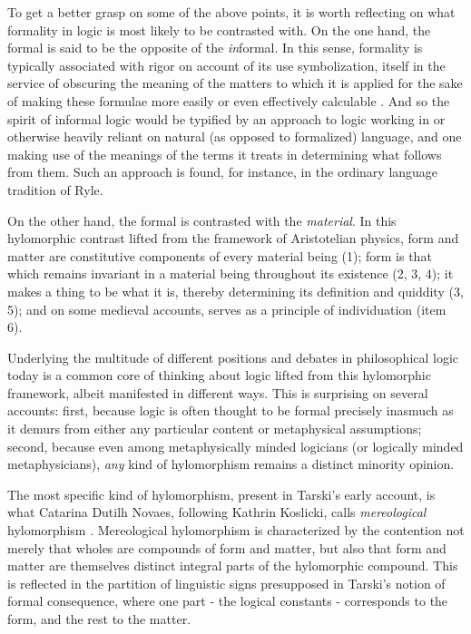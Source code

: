 \documentclass[]{article}
\begin{document}
	To get a better grasp on some of the above points, it is worth reflecting on what formality in logic is most likely to be contrasted with. On the one hand, the formal is said to be the opposite of the \textit{in}formal. In this sense, formality is typically associated with rigor on account of its use symbolization, itself in the service of obscuring the meaning of the matters to which it is applied for the sake of making these formulae more easily or even effectively calculable \cite[321-325]{DutilhNovaes2011}. And so the spirit of informal logic would be typified by an approach to logic working in or otherwise heavily reliant on natural (as opposed to formalized) language, and one making use of the meanings of the terms it treats in determining what follows from them. Such an approach is found, for instance, in the ordinary language tradition of Ryle.
	
	On the other hand, the formal is contrasted with the \textit{material}. In this hylomorphic contrast lifted from the framework of Aristotelian physics, form and matter are constitutive components of every material being (1); form is that which remains invariant in a material being throughout its existence (2, 3, 4); it makes a thing to be what it is, thereby determining its definition and quiddity (3, 5); and on some medieval accounts, serves as a principle of individuation (item 6).
	
	Underlying the multitude of different positions and debates in philosophical logic today is a common core of thinking about logic lifted from this hylomorphic framework, albeit manifested in different ways. This is surprising on several accounts: first, because logic is often thought to be formal precisely inasmuch as it demurs from either any particular content or metaphysical assumptions; second, because even among metaphysically minded logicians (or logically minded metaphysicians), \textit{any} kind of hylomorphism remains a distinct minority opinion.
	
	The most specific kind of hylomorphism, present in Tarski's early account, is what Catarina Dutilh Novaes, following Kathrin Koslicki, calls \textit{mereological} hylomorphism \cite{DutilhNovaes2012b} \cite{Koslicki2006}. Mereological hylomorphism is characterized by the contention not merely that wholes are compounds of form and matter, but also that form and matter are themselves distinct integral parts of the hylomorphic compound. This is reflected in the partition of linguistic signs presupposed in Tarski's notion of formal consequence, where one part - the logical constants  - corresponds to the form, and the rest to the matter.
	
\end{document}
